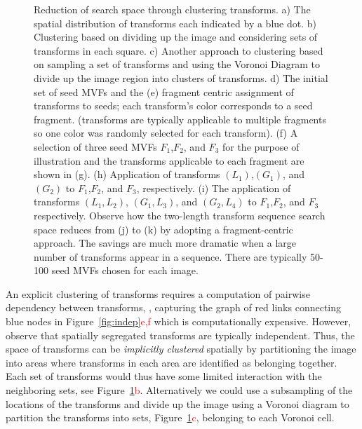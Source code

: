 \begin{figure}[!ht]
\caption{Reduction of search space through clustering transforms. a) The spatial distribution of transforms each indicated by a blue dot. b) Clustering based on dividing up the image and considering sets of transforms in each square. c) Another approach to clustering based on sampling a set of transforms and using the Voronoi Diagram to divide up the image region into clusters of transforms. d) The initial set of seed MVFs and the (e) fragment centric assignment of transforms to seeds; each transform's color corresponds to a seed fragment. (transforms are typically applicable to multiple fragments so one color was randomly selected for each transform). (f) A selection of three seed MVFs $F_1$,$F_2$, and $F_3$ for the purpose of illustration and the transforms applicable to each fragment are shown in (g). (h) Application of transforms $(L_1)$,$(G_1)$, and $(G_2)$ to $F_1$,$F_2$, and $F_3$, respectively. (i) The application of transforms $(L_1,L_2)$, $(G_1,L_3)$, and $(G_2,L_4)$ to $F_1$,$F_2$, and $F_3$ respectively. Observe how the two-length transform sequence search space reduces from (j) to (k) by adopting a fragment-centric approach. The savings are much more dramatic when a large number of transforms appear in a sequence. There are typically 50-100 seed MVFs chosen for each image.}
 \label{fig:cluster}
 \end{figure}


An explicit clustering of transforms requires a computation of pairwise dependency between transforms, \ie, capturing the graph of red links connecting blue nodes in Figure~\ref{fig:indep}\textcolor{red}{e,f} which is computationally expensive. However, observe that spatially segregated transforms are typically independent. Thus, the space of transforms can be {\em implicitly clustered} spatially by partitioning the image into areas where transforms in each area are identified as belonging together. Each set of transforms would thus have some limited interaction with the neighboring sets, see Figure~\ref{fig:cluster}\textcolor{red}{b}. Alternatively we could use a subsampling of the locations of the transforms and divide up the image using a Voronoi diagram to partition the transforms into sets, Figure~\ref{fig:cluster}\textcolor{red}{c}, belonging to each Voronoi cell. 


